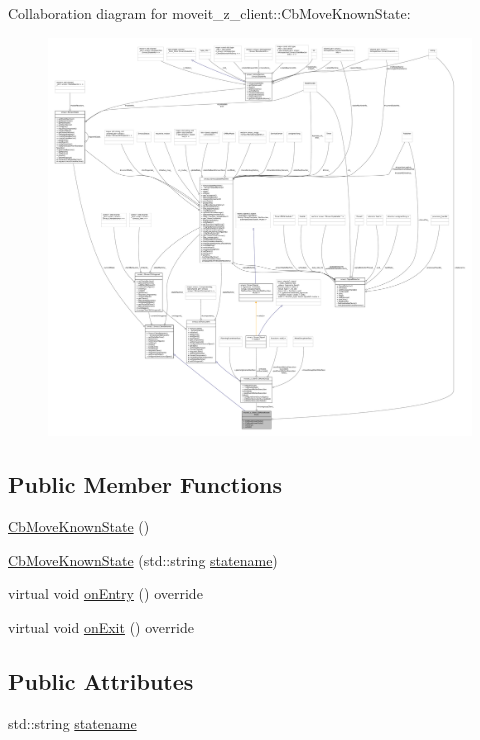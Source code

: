 Collaboration diagram for moveit\+\_\+z\+\_\+client\+:\+:Cb\+Move\+Known\+State\+:
\nopagebreak
\begin{figure}[H]
\begin{center}
\leavevmode
\includegraphics[width=350pt]{classmoveit__z__client_1_1CbMoveKnownState__coll__graph}
\end{center}
\end{figure}
\subsection*{Public Member Functions}
\begin{DoxyCompactItemize}
\item 
\hyperlink{classmoveit__z__client_1_1CbMoveKnownState_a2ea70daeb91cf4933d784de3a2189218}{Cb\+Move\+Known\+State} ()
\item 
\hyperlink{classmoveit__z__client_1_1CbMoveKnownState_a979cd1c7a80b314c921c8ff89867a3fa}{Cb\+Move\+Known\+State} (std\+::string \hyperlink{classmoveit__z__client_1_1CbMoveKnownState_a53449b08ffa077adb2f1d4efbd37f8d0}{statename})
\item 
virtual void \hyperlink{classmoveit__z__client_1_1CbMoveKnownState_a449644896e100c8233d58cb3a57bcff4}{on\+Entry} () override
\item 
virtual void \hyperlink{classmoveit__z__client_1_1CbMoveKnownState_a68eadb9713a6f2f9d87b1a4345ef3b1a}{on\+Exit} () override
\end{DoxyCompactItemize}
\subsection*{Public Attributes}
\begin{DoxyCompactItemize}
\item 
std\+::string \hyperlink{classmoveit__z__client_1_1CbMoveKnownState_a53449b08ffa077adb2f1d4efbd37f8d0}{statename}
\end{DoxyCompactItemize}
